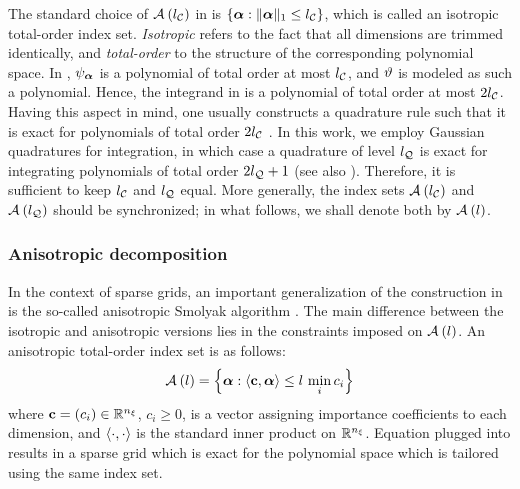 The standard choice of $\multiindexSet{\nclevel}$ in  is $\{ \multiindex: \norm[1]{\multiindex} \leq \nclevel \}$, which is called an isotropic total-order index set.
\emph{Isotropic} refers to the fact that all dimensions are trimmed identically, and \emph{total-order} to the structure of the corresponding polynomial space.
In , $\polynomial_{\multiindex}$ is a polynomial of total order at most $\nclevel$, and $\w$ is modeled as such a polynomial.
Hence, the integrand in  is a polynomial of total order at most $2 \nclevel$.
Having this aspect in mind, one usually constructs a quadrature rule such that it is exact for polynomials of total order $2 \nclevel$ \cite{eldred2008}.
In this work, we employ Gaussian quadratures for integration, in which case a quadrature of level $\nqlevel$ is exact for integrating polynomials of total order $2 \nqlevel + 1$ \cite{heiss2008} (see also ).
Therefore, it is sufficient to keep $\nclevel$ and $\nqlevel$ equal.
More generally, the index sets $\multiindexSet{\nclevel}$ and $\multiindexSet{\nqlevel}$ should be synchronized; in what follows, we shall denote both by $\multiindexSet{\level}$.

\subsubsection{Anisotropic decomposition}
In the context of sparse grids, an important generalization of the construction in  is the so-called anisotropic Smolyak algorithm \cite{nobile2008}.
The main difference between the isotropic and anisotropic versions lies in the constraints imposed on $\quadratureMultiindexSet{\level}$.
An anisotropic total-order index set is as follows:
\begin{equation} \elab{anisotropic-total-order-index-set}
  \chaosMultiindexSet{\level} = \left\{ \multiindex: \innerProduct{\dimensionAnisotropy, \multiindex} \leq \level \, \min_i c_i \right\}
\end{equation}
where $\dimensionAnisotropy = (c_i) \in \real^\nvars$, $c_i \geq 0$, is a vector assigning importance coefficients to each dimension, and $\innerProduct{\cdot, \cdot}$ is the standard inner product on $\real^\nvars$.
Equation  plugged into  results in a sparse grid which is exact for the polynomial space which is tailored using the same index set.

